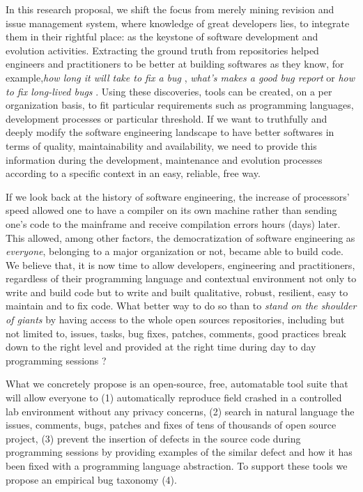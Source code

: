 In this research proposal, we shift the focus from merely mining revision and issue management system, where knowledge of great developers lies, to integrate them in their rightful place: as the keystone of software development and evolution activities.
Extracting the ground truth from repositories helped engineers and practitioners to be better at building softwares as they know, for example,{\it how long it will take to fix a bug} \cite{Weiss2007}, {\it what's makes a good bug report} \cite{Bettenburg2008} or {\it how to fix long-lived bugs} \cite{Saha2014}.
Using these discoveries, tools can be created, on a per organization basis, to fit particular requirements such as programming languages, development processes or particular threshold. If we want to truthfully and deeply modify the software engineering landscape to have better softwares in terms of quality, maintainability and availability, we need to provide this information during the development, maintenance and evolution processes according to a specific context in an easy, reliable, free way.

If we look back at the history of software engineering, the increase of processors' speed allowed one to have a compiler on its own machine rather than sending one's code to the mainframe and receive compilation errors hours (days) later. This allowed, among other factors, the democratization of software engineering as {\it everyone}, belonging to a major organization or not, became able to build code. We believe that, it is now time to allow developers, engineering and practitioners, regardless of their programming language and contextual environment not only to write and build code but to write and built qualitative, robust, resilient, easy to maintain and to fix code. What better way to do so than to {\it stand on the shoulder of giants} by having access to the whole open sources repositories, including but not limited to, issues, tasks, bug fixes, patches, comments, good practices break down to the right level and provided at the right time during day to day programming sessions ?

What we concretely propose is an open-source, free, automatable tool suite that will allow everyone to (1) automatically reproduce field crashed in a controlled lab environment without any privacy concerns, (2) search in natural language the issues, comments, bugs, patches and fixes of tens of thousands of open source project, (3) prevent the insertion of defects in the source code during programming sessions by providing examples of the similar defect and how it has been fixed with a programming language abstraction. To support these tools we propose an empirical bug taxonomy (4).

